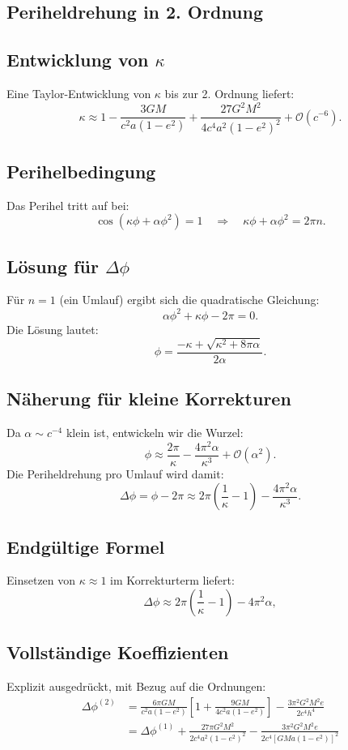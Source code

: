 \subsection{Periheldrehung in 2. Ordnung}
\subsection*{Entwicklung von $\kappa$}
Eine Taylor-Entwicklung von $\kappa$ bis zur 2. Ordnung liefert:
\[
    \kappa \approx 1 - \frac{3GM}{c^2 a(1 - e^2)} + \frac{27G^2 M^2}{4c^4 a^2 (1 - e^2)^2} + \mathcal{O}(c^{-6}).
\]

\subsection*{Perihelbedingung}
Das Perihel tritt auf bei:
\[
    \cos\left(\kappa\phi + \alpha\phi^2\right) = 1 \quad \Rightarrow \quad \kappa\phi + \alpha\phi^2 = 2\pi n.
\]

\subsection*{Lösung für $\Delta\phi$}
Für $n=1$ (ein Umlauf) ergibt sich die quadratische Gleichung:
\[
\alpha\phi^2 + \kappa\phi - 2\pi = 0.
\]
Die Lösung lautet:
\begin{equation}
\phi = \frac{-\kappa + \sqrt{\kappa^2 + 8\pi\alpha}}{2\alpha}.
\end{equation}

\subsection*{Näherung für kleine Korrekturen}
Da $\alpha \sim c^{-4}$ klein ist, entwickeln wir die Wurzel:
\[
    \phi \approx \frac{2\pi}{\kappa} - \frac{4\pi^2\alpha}{\kappa^3} + \mathcal{O}(\alpha^2).
\]
Die Periheldrehung pro Umlauf wird damit:
\begin{equation}
\Delta\phi = \phi - 2\pi \approx 2\pi\left(\frac{1}{\kappa} - 1\right) - \frac{4\pi^2\alpha}{\kappa^3}.    
\end{equation}

\subsection*{Endgültige Formel}
Einsetzen von $\kappa \approx 1$ im Korrekturterm liefert:
\begin{equation}
\boxed
{
    \Delta\phi \approx 2\pi\left(\frac{1}{\kappa} - 1\right) - 4\pi^2\alpha
},
\end{equation}

\subsection*{Vollständige Koeffizienten}
Explizit ausgedrückt, mit Bezug auf die Ordnungen:
\begin{align*}
\Delta\phi^{(2)} &= \frac{6\pi GM}{c^2 a(1 - e^2)} \left[1 + \frac{9GM}{4c^2 a(1 - e^2)}\right] - \frac{3\pi^2 G^2 M^2 e}{2c^4 h^4} \\
&= \Delta\phi^{(1)} + \frac{27\pi G^2 M^2}{2c^4 a^2 (1 - e^2)^2} - \frac{3\pi^2 G^2 M^2 e}{2c^4 [GMa(1 - e^2)]^2}
\end{align*}
